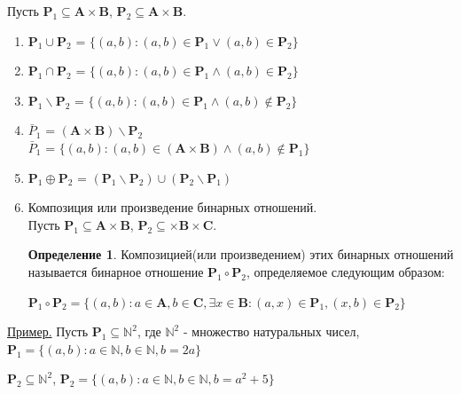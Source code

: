 \documentclass[12pt, a4paper, oneside]{article}
\theoremstyle{plain} %
\theoremstyle{definition}
\newtheorem*{definition}{Определение}  %
\begin{document}
Пусть $\textbf{P}_1 \subseteq \textbf{A} \times \textbf{B}$, $\textbf{P}_2 \subseteq \textbf{A} \times \textbf{B}$.
\begin{enumerate}
    
    \item $\textbf{P}_1 \cup \textbf{P}_2$ = $\{(a,b) : (a,b) \in \textbf{P}_1 \vee (a,b) \in \textbf{P}_2\}$
    
    \item $\textbf{P}_1 \cap \textbf{P}_2$ = $\{(a,b) : (a,b) \in \textbf{P}_1 \wedge (a,b) \in \textbf{P}_2\}$
    
    \item $\textbf{P}_1 \backslash \textbf{P}_2$ = $\{(a,b) : (a,b) \in \textbf{P}_1 \wedge (a,b) \notin \textbf{P}_2\}$
    
    \item $\bar{P}_1$ = $(\textbf{A} \times \textbf{B}) \backslash \textbf{P}_2$ \\
    $\bar{P}_1$ = $\{(a,b): (a,b) \in (\textbf{A} \times \textbf{B}) \wedge (a,b) \notin \textbf{P}_1\}$
    
    \item $\textbf{P}_1 \oplus \textbf{P}_2$ = $(\textbf{P}_1 \backslash \textbf{P}_2) \cup (\textbf{P}_2 \backslash \textbf{P}_1)$
    
    \item Композиция или произведение бинарных отношений. \\
    Пусть $\textbf{P}_1 \subseteq \textbf{A} \times \textbf{B}$, $\textbf{P}_2 \subseteq \times \textbf{B} \times \textbf{C}$.
    \begin{definition}
    
    Композицией(или произведением) этих бинарных отношений называется бинарное отношение $\textbf{P}_1 \circ \textbf{P}_2$, определяемое следующим образом:
    
    
    $\textbf{P}_1 \circ \textbf{P}_2 = \{(a,b): a \in \textbf{A}, b \in \textbf{C}, \exists x \in \textbf{B}: (a,x) \in \textbf{P}_1, (x,b) \in \textbf{P}_2\}$
    \end{definition}
    
\end{enumerate}

\underline{Пример.} Пусть $\textbf{P}_1 \subseteq \mathbb{N}^2$, где $\mathbb{N}^2$ - множество натуральных чисел, $\textbf{P}_1 = \{(a,b): a \in \mathbb{N}, b \in \mathbb{N}, b = 2a\}$ 


$\textbf{P}_2 \subseteq \mathbb{N}^2$,  $\textbf{P}_2 = \{(a,b): a \in \mathbb{N}, b \in \mathbb{N}, b = a^2 + 5\}$
\end{document}
